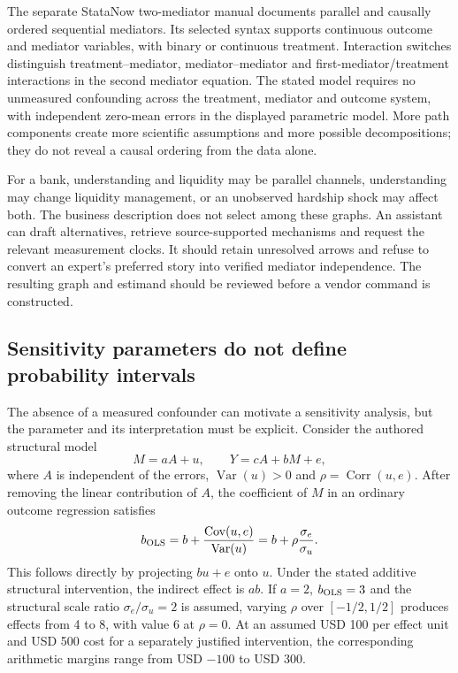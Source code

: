 The separate StataNow two-mediator manual documents parallel and causally ordered sequential mediators. Its selected syntax supports continuous outcome and mediator variables, with binary or continuous treatment. Interaction switches distinguish treatment--mediator, mediator--mediator and first-mediator/treatment interactions in the second mediator equation. The stated model requires no unmeasured confounding across the treatment, mediator and outcome system, with independent zero-mean errors in the displayed parametric model. More path components create more scientific assumptions and more possible decompositions; they do not reveal a causal ordering from the data alone.~\citep{exec20_med_stata_multiple}

For a bank, understanding and liquidity may be parallel channels, understanding may change liquidity management, or an unobserved hardship shock may affect both. The business description does not select among these graphs. An assistant can draft alternatives, retrieve source-supported mechanisms and request the relevant measurement clocks. It should retain unresolved arrows and refuse to convert an expert's preferred story into verified mediator independence. The resulting graph and estimand should be reviewed before a vendor command is constructed.

\subsection{Sensitivity parameters do not define probability intervals}
\label{exec20:med-sensitivity}
The absence of a measured confounder can motivate a sensitivity analysis, but the parameter and its interpretation must be explicit. Consider the authored structural model
\begin{equation}
 M=aA+u,\qquad Y=cA+bM+e,
 \label{exec20:med-residual-law}
\end{equation}
where $A$ is independent of the errors, $\operatorname{Var}(u)>0$ and
$\rho=\operatorname{Corr}(u,e)$. After removing the linear contribution of $A$, the coefficient of $M$ in an ordinary outcome regression satisfies
\begin{equation}
 b_{\rm OLS}
   =b+\frac{\operatorname{Cov}(u,e)}{\operatorname{Var}(u)}
   =b+\rho\frac{\sigma_e}{\sigma_u}.
 \label{exec20:med-bias}
\end{equation}
This follows directly by projecting $bu+e$ onto $u$. Under the stated additive structural intervention, the indirect effect is $ab$. If $a=2$, $b_{\rm OLS}=3$ and the structural scale ratio $\sigma_e/\sigma_u=2$ is assumed, varying $\rho$ over $[-1/2,1/2]$ produces effects from 4 to 8, with value 6 at $\rho=0$. At an assumed USD 100 per effect unit and USD 500 cost for a separately justified intervention, the corresponding arithmetic margins range from USD $-100$ to USD 300.~\citep{exec20_med_reference}

